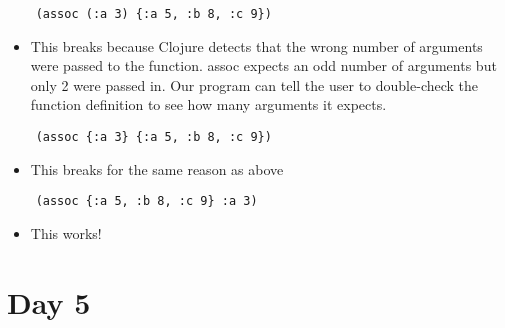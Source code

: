 \documentclass[12pt]{article}
\begin{document}
\begin{verbatim}
	(assoc (:a 3) {:a 5, :b 8, :c 9})
\end{verbatim}
\begin{itemize}
	\item This breaks because Clojure detects that the wrong number of arguments were passed to the function. assoc expects an odd number of arguments but only 2 were passed in. Our program can tell the user to double-check the function definition to see how many arguments it expects.
\end{itemize}

\begin{verbatim}
	(assoc {:a 3} {:a 5, :b 8, :c 9})
\end{verbatim}
\begin{itemize}
	\item This breaks for the same reason as above
\end{itemize}

\begin{verbatim}
	(assoc {:a 5, :b 8, :c 9} :a 3)
\end{verbatim}
\begin{itemize}
	\item This works!
\end{itemize}

\section{Day 5}


\end{document}
